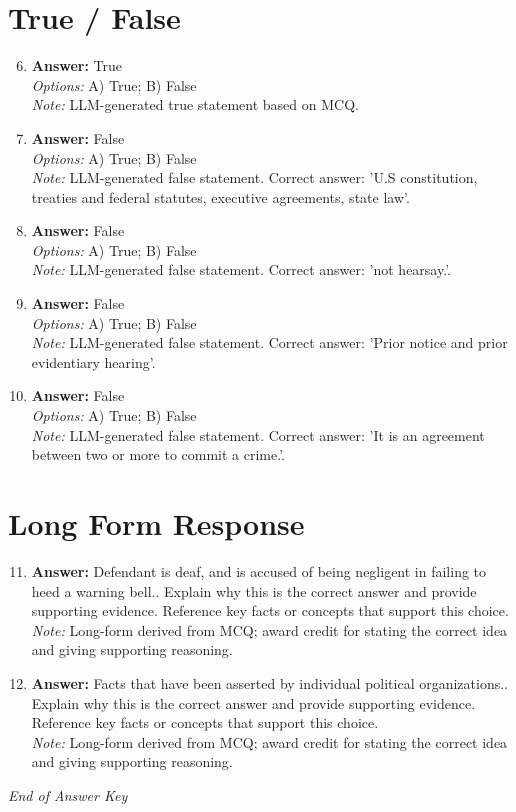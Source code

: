 \documentclass[12pt]{article}
\begin{document}
\section*{True / False}
\begin{enumerate}[label=\arabic*.]
\setcounter{enumi}{5}
\item \textbf{Answer:} True
\\ \textit{Options:} A) True; B) False
\\ \textit{Note:} LLM-generated true statement based on MCQ.
\item \textbf{Answer:} False
\\ \textit{Options:} A) True; B) False
\\ \textit{Note:} LLM-generated false statement. Correct answer: 'U.S constitution, treaties and federal statutes, executive agreements, state law'.
\item \textbf{Answer:} False
\\ \textit{Options:} A) True; B) False
\\ \textit{Note:} LLM-generated false statement. Correct answer: 'not hearsay.'.
\item \textbf{Answer:} False
\\ \textit{Options:} A) True; B) False
\\ \textit{Note:} LLM-generated false statement. Correct answer: 'Prior notice and prior evidentiary hearing'.
\item \textbf{Answer:} False
\\ \textit{Options:} A) True; B) False
\\ \textit{Note:} LLM-generated false statement. Correct answer: 'It is an agreement between two or more to commit a crime.'.
\end{enumerate}

\section*{Long Form Response}
\begin{enumerate}[label=\arabic*.]
\setcounter{enumi}{10}
\item \textbf{Answer:} Defendant is deaf, and is accused of being negligent in failing to heed a warning bell.. Explain why this is the correct answer and provide supporting evidence. Reference key facts or concepts that support this choice.
\\ \textit{Note:} Long-form derived from MCQ; award credit for stating the correct idea and giving supporting reasoning.
\item \textbf{Answer:} Facts that have been asserted by individual political organizations.. Explain why this is the correct answer and provide supporting evidence. Reference key facts or concepts that support this choice.
\\ \textit{Note:} Long-form derived from MCQ; award credit for stating the correct idea and giving supporting reasoning.
\end{enumerate}

\vfill
\noindent\textit{End of Answer Key}
\end{document}
